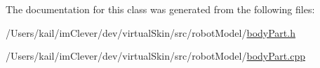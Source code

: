 The documentation for this class was generated from the following files:\begin{DoxyCompactItemize}
\item 
/Users/kail/imClever/dev/virtualSkin/src/robotModel/\hyperlink{body_part_8h}{bodyPart.h}\item 
/Users/kail/imClever/dev/virtualSkin/src/robotModel/\hyperlink{body_part_8cpp}{bodyPart.cpp}\end{DoxyCompactItemize}
